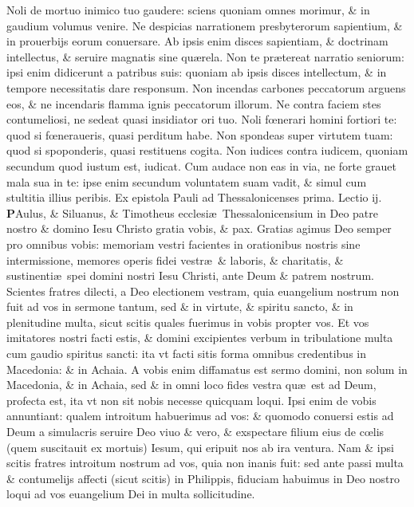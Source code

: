 \documentclass[a5paper,10pt]{book}
\def\rightmarginnote{%
	\lrmarginnote{\hskip\columnwidth \hskip -1em}}
\def\ae{æ}
\def\oe{œ}
\begin{document}
\begin{multicols*}{2}
Noli de mortuo inimico tuo gaudere: sciens quoniam omnes morimur, \& in gaudium volumus venire. Ne despicias narrationem presbyterorum sapientium, \& in prouerbijs eorum conuersare.
Ab ipsis enim disces sapientiam, \& doctrinam intellectus, \& seruire magnatis sine qu\ae rela.
Non te pr\ae tereat narratio seniorum: ipsi enim didicerunt a patribus suis: quoniam ab ipsis disces intellectum, \& in tempore necessitatis dare responsum.
Non incendas carbones peccatorum arguens eos, \& ne incendaris flamma ignis peccatorum illorum. Ne contra faciem stes contumeliosi, ne sedeat quasi insidiator ori tuo.
Noli f\oe nerari homini fortiori te: quod si f\oe neraueris, quasi perditum habe.
Non spondeas super virtutem tuam: quod si spoponderis, quasi restituens cogita. Non iudices contra iudicem, quoniam secundum quod iustum est, iudicat.
Cum audace non eas in via, ne forte grauet mala sua in te: ipse enim secundum
voluntatem suam vadit, \& simul cum stultitia illius peribis.
\newline {} \color{red} Ex epistola Pauli ad Thessalonicenses prima. \quad Lectio ij. \color{black}
\vspace{-1.25em}
\lettrine[lines=2]{\bfseries \color{red} P}{}Aulus,\rightmarginnote{ca. 1.} \& Siluanus, \& Timotheus ecclesi\ae \ Thessalonicensium in Deo patre nostro \& domino Iesu Christo gratia vobis, \& pax.
Gratias agimus Deo semper pro omnibus vobis: memoriam vestri facientes in orationibus nostris sine intermissione, memores operis fidei vestr\ae \ \& laboris, \& charitatis, \& sustinenti\ae \ spei domini nostri Iesu Christi, ante Deum \& patrem nostrum.
Scientes fratres dilecti, a Deo electionem vestram, quia euangelium nostrum non fuit ad vos in sermone tantum, sed \& in virtute, \& spiritu sancto, \& in plenitudine multa, sicut scitis quales fuerimus in vobis propter vos.
Et vos imitatores nostri facti estis, \& domini excipientes verbum in tribulatione multa cum gaudio spiritus sancti: ita vt facti sitis forma omnibus credentibus in Macedonia: \& in Achaia.
A vobis enim diffamatus est sermo domini, non solum in Macedonia, \& in Achaia, sed \& in omni loco fides vestra qu\ae \ est ad Deum, profecta est, ita vt non sit nobis necesse quicquam loqui.
Ipsi enim de vobis annuntiant: qualem introitum habuerimus ad vos: \& quomodo conuersi estis ad Deum a simulacris seruire Deo viuo \& vero, \& exspectare filium eius de c\oe lis (quem suscitauit ex mortuis) Iesum, qui eripuit nos ab ira ventura.
\newline \indent Nam\rightmarginnote{ca. 2.} \& ipsi scitis fratres introitum nostrum ad vos, quia non inanis fuit: sed ante passi multa \& contumelijs affecti (sicut scitis) in Philippis, fiduciam habuimus in Deo nostro loqui ad vos euangelium Dei in multa sollicitudine.

\end{multicols*}
\end{document}
